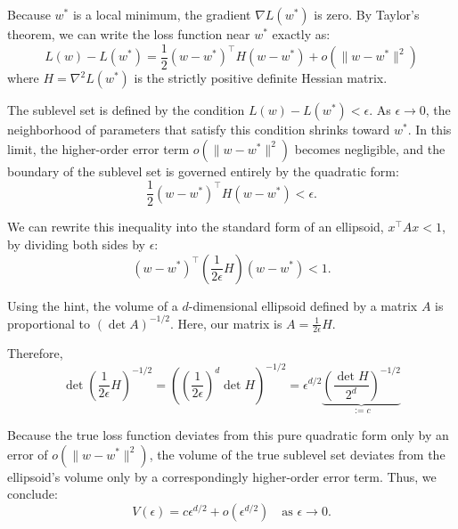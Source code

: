 \documentclass[11pt]{article}
\begin{document}

\begin{solution}
    Because $w^*$ is a local minimum, the gradient $\nabla L(w^*)$ is zero. By Taylor's theorem, we can write the loss function near $w^*$ exactly as:
    $$L(w) - L(w^*) = \frac{1}{2} (w - w^*)^\top H (w - w^*) + o(\|w - w^*\|^2)$$
    where $H = \nabla^2 L(w^*)$ is the strictly positive definite Hessian matrix.
    
    The sublevel set is defined by the condition $L(w) - L(w^*) < \epsilon$. As $\epsilon \to 0$, the neighborhood of parameters that satisfy this condition shrinks toward $w^*$. In this limit, the higher-order error term $o(\|w - w^*\|^2)$ becomes negligible, and the boundary of the sublevel set is governed entirely by the quadratic form:
    $$\frac{1}{2} (w - w^*)^\top H (w - w^*) < \epsilon.$$
    
    We can rewrite this inequality into the standard form of an ellipsoid, $x^\top A x < 1$, by dividing both sides by $\epsilon$:
    $$(w - w^*)^\top \left( \frac{1}{2\epsilon} H \right) (w - w^*) < 1.$$
    
    Using the hint, the volume of a $d$-dimensional ellipsoid defined by a matrix $A$ is proportional to $(\det A)^{-1/2}$. Here, our matrix is $A = \frac{1}{2\epsilon}H$. 
    
    Therefore,
    $$\det\left( \frac{1}{2\epsilon} H \right)^{-1/2} = \left( \left(\frac{1}{2\epsilon}\right)^d \det H \right)^{-1/2} = \epsilon^{d/2} \underbrace{\left( \frac{\det H}{2^d} \right)^{-1/2}}_{:=c} $$
    
    Because the true loss function deviates from this pure quadratic form only by an error of $o(\|w - w^*\|^2)$, the volume of the true sublevel set deviates from the ellipsoid's volume only by a correspondingly higher-order error term. Thus, we conclude:
    $$V(\epsilon) = c \epsilon^{d/2} + o(\epsilon^{d/2}) \quad \text{as } \epsilon \to 0.$$
\end{solution}
\end{document}

